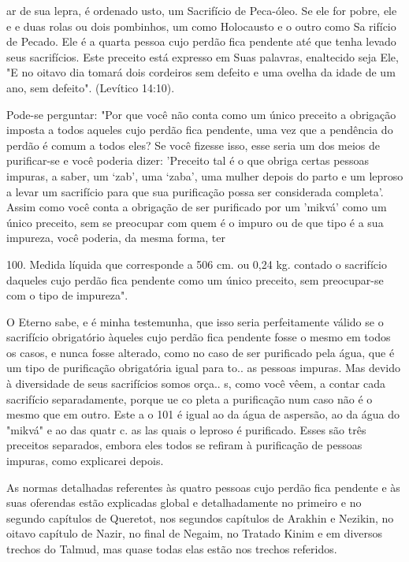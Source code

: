 \begin{itemize}
\begin{enumrate}
\begin{itemize}
\begin{itemize}
ar de sua lepra, é ordenado usto, um Sacrifício de Peca-óleo. Se ele for
pobre, ele e e duas rolas ou dois pombi­nhos, um como Holocausto e o
outro como Sa rifício de Pecado. Ele é a quarta pessoa cujo perdão fica
pendente até que tenha levado seus sacrifícios. Este pre­ceito está
expresso em Suas palavras, enaltecido seja Ele, "E no oitavo dia to­mará
dois cordeiros sem defeito e uma ovelha da idade de um ano, sem
defei­to". (Levítico 14:10).

Pode-se perguntar: "Por que você não conta como um único pre­ceito a
obrigação imposta a todos aqueles cujo perdão fica pendente, uma vez que
a pendência do perdão é comum a todos eles? Se você fizesse isso, esse
seria um dos meios de purificar-se e você poderia dizer: 'Preceito tal é
o que obriga certas pessoas impuras, a saber, um `zab', uma `zaba', uma
mulher de­pois do parto e um leproso a levar um sacrifício para que sua
purificação possa ser considerada completa'. Assim como você conta a
obrigação de ser purifica­do por um 'mikvá' como um único preceito, sem
se preocupar com quem é o impuro ou de que tipo é a sua impureza, você
poderia, da mesma forma, ter

100. Medida líquida que corresponde a 506 cm. ou 0,24
kg.
contado o sacrifício daqueles cujo perdão fica pendente como um único
pre­ceito, sem preocupar-se com o tipo de impureza".

O Eterno sabe, e é minha testemunha, que isso seria perfeitamente válido
se o sacrifício obrigatório àqueles cujo perdão fica pendente fosse o
mes­mo em todos os casos, e nunca fosse alterado, como no caso de ser
purificado pela água, que é um tipo de purificação obrigatória igual
para to.. as pessoas impuras. Mas devido à diversidade de seus
sacrifícios somos orça.. s, como você vêem, a contar cada sacrifício
separadamente, porque ue co pleta a purificação num caso não é o mesmo
que em outro. Este a o 101 é igual ao da água de aspersão, ao da água do
"mikvá" e ao das quatr c. as las quais o leproso é purificado. Esses são
três preceitos separados, embora eles todos se refiram à purificação de
pessoas impuras, como explicarei depois.

As normas detalhadas referentes às quatro pessoas cujo perdão fica
pendente e às suas oferendas estão explicadas global e detalhadamente no
pri­meiro e no segundo capítulos de Queretot, nos segundos capítulos de
Arakhin e Nezikin, no oitavo capítulo de Nazir, no final de Negaim, no
Tratado Kinim e em diversos trechos do Talmud, mas quase todas elas
estão nos trechos referidos.


\end{itemize}
\end{itemize}
\end{enumrate}
\end{itemize}
